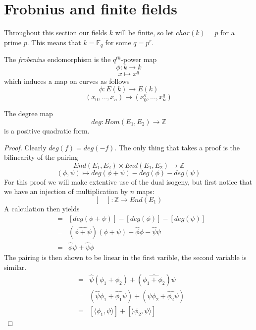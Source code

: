 \section{Frobnius and finite fields}
Throughout this section our fields $k$ will be finite, so let $char(k) = p$ for
a prime $p$. This means that $k = \mathbb{F}_{q}$ for some $q = p^r$.

\begin{mydef}
 The \emph{frobenius} endomorphism is the $q^{th}$-power map
$$ \phi: k \rightarrow k $$
$$ x \mapsto x^q $$
which induces a map on curves as follows
$$ \phi: E(k) \rightarrow E(k) $$
$$ (x_0,\ldots , x_n) \mapsto (x_0^q, \ldots , x_n^q) $$
\end{mydef}

\begin{prop}
 The degree map
$$ deg: Hom(E_1, E_2) \rightarrow \mathbb{Z} $$
is a positive quadratic form.
\end{prop}
\begin{proof}
 Clearly $deg(f) = deg(-f)$. The only thing that takes a proof is the
bilinearity of the pairing
$$ End(E_1, E_2) \times End(E_1, E_2) \rightarrow \mathbb{Z}$$
$$ (\phi, \psi) \mapsto deg(\phi + \psi) - deg(\phi) - deg(\psi) $$
For this proof we will make extentive use of the dual isogeny, but first
notice that we have an injection of multiplication by $n$ maps:
$$ [\quad]: \mathbb{Z} \rightarrow End(E_1) $$
A calculation then yields 
\begin{eqnarray*} 
 [\langle \phi,\psi \rangle] &=& [deg(\phi+\psi)]-[deg(\phi)]-[deg(\psi)] \nonumber \\
               &=& (\widehat{\phi+\psi})(\phi+\psi) - \widehat{\phi}\phi - \widehat{\psi}\psi \nonumber \\
	       &=& \widehat{\phi}\psi + \widehat{\psi}\phi
\end{eqnarray*}
The pairing is then shown to be linear in the first varible, the second variable is
similar.
\begin{eqnarray*}
 [\langle \phi_1+\phi_2, \psi \rangle] &=& \widehat{\psi}(\phi_1+\phi_2) + (\widehat{\phi_1+\phi_2})\psi \nonumber \\
			 &=& (\widehat{\psi}\phi_1+\widehat{\phi_1}\psi) + (\widehat{\psi}\phi_2 + \widehat{\phi_2}\psi) \nonumber \\
			 &=& [\langle \phi_1,\psi \rangle] + [\rangle \phi_2,\psi \rangle] 
\end{eqnarray*}
\end{proof}

